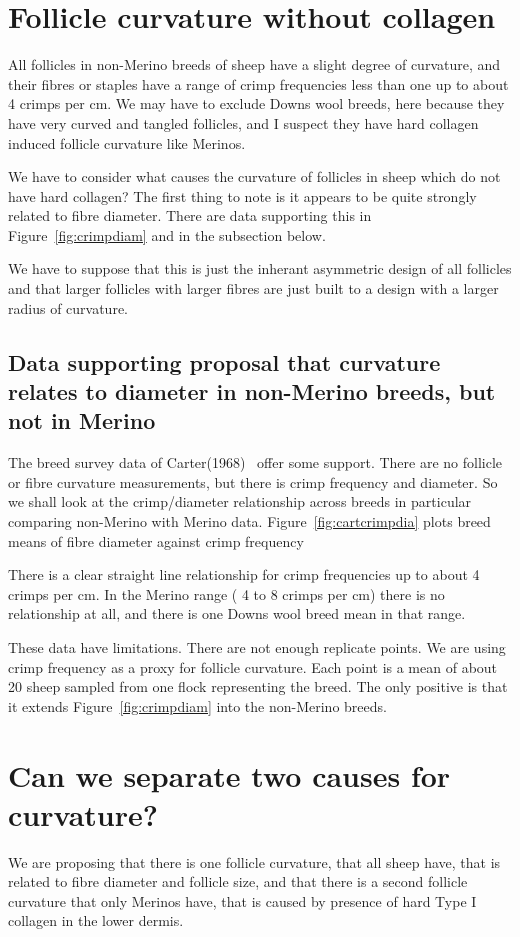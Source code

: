 \documentclass{article}
\begin{document}
\section{Follicle curvature without collagen}
All follicles in non-Merino breeds of sheep have a slight degree of curvature, and their fibres or staples have a range of crimp frequencies less than one up to about 4 crimps per cm.  We may have to exclude Downs wool breeds, here because they have very curved and tangled follicles, and I suspect they have hard collagen induced follicle curvature like Merinos.

We have to consider what causes the curvature of follicles in sheep which do not have hard collagen? The first thing to note is it appears to be quite strongly related to fibre diameter. There are data supporting this in Figure~\ref{fig:crimpdiam} and in the subsection below.

We have to suppose that this is just the inherant asymmetric design of all follicles and that larger follicles with larger fibres are just built to a design with a larger radius of curvature.

\subsection{Data supporting proposal that curvature relates to diameter in non-Merino breeds, but not in Merino}
The breed survey data of Carter(1968)~\cite{carter-1968} offer some support. There are no follicle or fibre curvature measurements, but there is crimp frequency and diameter. So we shall look at the crimp/diameter relationship  across breeds in particular comparing non-Merino with Merino data. Figure~\ref{fig:cartcrimpdia} plots breed means of fibre diameter against crimp frequency

There is a clear straight line relationship for crimp frequencies up to about 4 crimps per cm. In the Merino range ( 4 to 8 crimps per cm) there is no relationship at all, and there is one Downs wool breed mean in that range. 

These data have limitations. There are not enough replicate points. We are using crimp frequency as a proxy for follicle curvature. Each point is a mean of about 20 sheep sampled from one flock representing the breed. The only positive is that it extends Figure~\ref{fig:crimpdiam} into the non-Merino breeds.

\section{Can we separate two causes for curvature?}
We are proposing that there is one follicle curvature, that all sheep have, that is related to fibre diameter and follicle size, and that there is a second follicle curvature that only Merinos have, that is caused by  presence of hard Type I collagen in the lower dermis.
\end{document}
